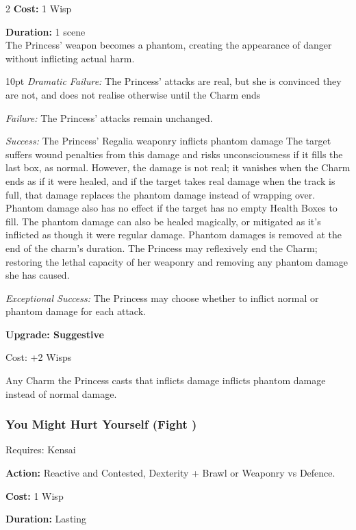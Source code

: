 \begin{multicols}{2}
\noindent \textbf{Cost:} 1 Wisp

\noindent \textbf{Duration:} 1 scene \\

\noindent The Princess' weapon becomes a phantom, creating the appearance of danger without inflicting actual harm.

\begin{myindentpar}{10pt} 
\emph{Dramatic Failure:} The Princess' attacks are real, but she is convinced they are not, and does not realise otherwise until the Charm ends

\emph{Failure:} The Princess' attacks remain unchanged.

\emph{Success:} The Princess' Regalia weaponry inflicts phantom damage The target suffers wound penalties from this damage and risks unconsciousness if it fills the last box, as normal. However, the damage is not real; it vanishes when the Charm ends as if it were healed, and if the target takes real damage when the track is full, that damage replaces the phantom damage instead of wrapping over. Phantom damage also has no effect if the target has no empty Health Boxes to fill. The phantom damage can also be healed magically, or mitigated as it's inflicted as though it were regular damage. Phantom damages is removed at the end of the charm's duration. The Princess may reflexively end the Charm; restoring the lethal capacity of her weaponry and removing any phantom damage she has caused. 

\emph{Exceptional Success:} The Princess may choose whether to inflict normal or phantom damage for each attack.

\textbf{Upgrade: Suggestive}

Cost: +2 Wisps

Any Charm the Princess casts that inflicts damage inflicts phantom damage instead of normal damage. 

\end{myindentpar}
\subsubsection*{You Might Hurt Yourself (Fight \textbullet\textbullet)}

\noindent Requires: Kensai 

\noindent \textbf{Action:} Reactive and Contested, Dexterity + Brawl or Weaponry vs Defence.

\noindent \textbf{Cost:} 1 Wisp

\noindent \textbf{Duration:} Lasting \\


\end{multicols}
